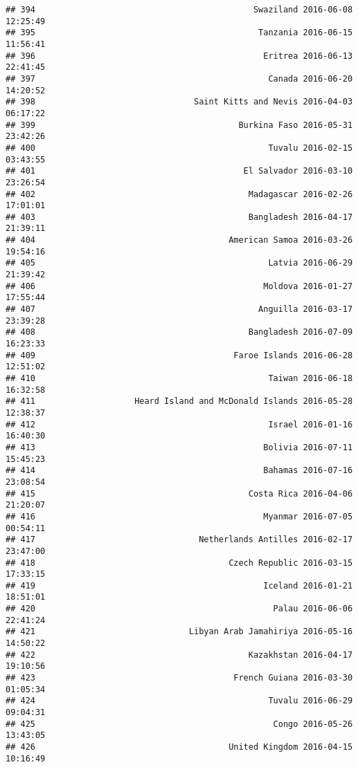\documentclass[
]{article}
\begin{document}
\begin{verbatim}
## 394                                            Swaziland 2016-06-08 12:25:49
## 395                                             Tanzania 2016-06-15 11:56:41
## 396                                              Eritrea 2016-06-13 22:41:45
## 397                                               Canada 2016-06-20 14:20:52
## 398                                Saint Kitts and Nevis 2016-04-03 06:17:22
## 399                                         Burkina Faso 2016-05-31 23:42:26
## 400                                               Tuvalu 2016-02-15 03:43:55
## 401                                          El Salvador 2016-03-10 23:26:54
## 402                                           Madagascar 2016-02-26 17:01:01
## 403                                           Bangladesh 2016-04-17 21:39:11
## 404                                       American Samoa 2016-03-26 19:54:16
## 405                                               Latvia 2016-06-29 21:39:42
## 406                                              Moldova 2016-01-27 17:55:44
## 407                                             Anguilla 2016-03-17 23:39:28
## 408                                           Bangladesh 2016-07-09 16:23:33
## 409                                        Faroe Islands 2016-06-28 12:51:02
## 410                                               Taiwan 2016-06-18 16:32:58
## 411                    Heard Island and McDonald Islands 2016-05-28 12:38:37
## 412                                               Israel 2016-01-16 16:40:30
## 413                                              Bolivia 2016-07-11 15:45:23
## 414                                              Bahamas 2016-07-16 23:08:54
## 415                                           Costa Rica 2016-04-06 21:20:07
## 416                                              Myanmar 2016-07-05 00:54:11
## 417                                 Netherlands Antilles 2016-02-17 23:47:00
## 418                                       Czech Republic 2016-03-15 17:33:15
## 419                                              Iceland 2016-01-21 18:51:01
## 420                                                Palau 2016-06-06 22:41:24
## 421                               Libyan Arab Jamahiriya 2016-05-16 14:50:22
## 422                                           Kazakhstan 2016-04-17 19:10:56
## 423                                        French Guiana 2016-03-30 01:05:34
## 424                                               Tuvalu 2016-06-29 09:04:31
## 425                                                Congo 2016-05-26 13:43:05
## 426                                       United Kingdom 2016-04-15 10:16:49

\end{verbatim}
\end{document}
